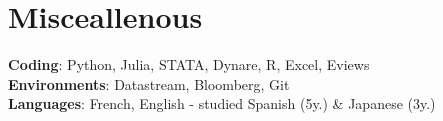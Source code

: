 \documentclass[letterpaper,10pt]{article}
\begin{document}
\section{Misceallenous}
\begin{itemize}[leftmargin=0.15in, label={}]
\small{\item{
\textbf{Coding}{: Python, Julia, STATA, Dynare, R, Excel, Eviews} \\
\textbf{Environments}{: Datastream, Bloomberg, Git}\\
\textbf{Languages}{: French, English - studied Spanish (5y.) \& Japanese (3y.)} \\
}}
\end{itemize}
\end{document}
